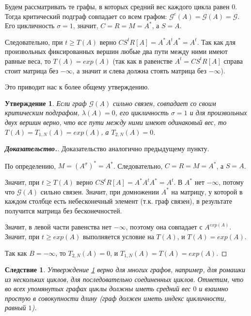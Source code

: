 \documentclass[12pt]{article}
\newtheorem{proposition}[theorem]{Утверждение}
\newtheorem{corollary}[theorem]{Следствие}
\begin{document}
Будем рассматривать те графы, в которых средний вес каждого цикла равен $0$. Тогда критический подграф совпадает со всем графом: $\mathcal{G}^c(A) = \mathcal{G}(A) = \mathcal{G}$. Его цикличность $\sigma = 1$, значит, $C = R = M = A^*$, а $S = A$.

Следовательно, при $t \ge T(A)$ верно $CS^tR[A] = A^*A^tA^* = A^t$. Так как для произвольных фиксированных вершин любые два пути между ними имеют равные веса, то $T(A) = exp(A)$ (так как в равенстве $A^t = CS^tR[A]$ справа стоит матрица без $-\infty$, а значит и слева должна стоять матрица без $-\infty$).

Это приводит нас к более общему утверждению.

\begin{proposition} \label{onePathProposition}
Если граф $\mathcal{G}(A)$ сильно связен, совпадает со своим критическим подграфом, $\lambda(A) = 0$, его цикличность $\sigma = 1$ и для произвольных двух вершин верно, что все пути между ними имеют одинаковый вес, то $T(A) = T_{1, N}(A) = exp(A)$, а $T_{2,N}(A) = 0$.
\end{proposition}
\begin{proof}[\textbf{Доказательство.}]
Доказательство аналогично предыдущему пункту.

По определению, $M = (A^\sigma)^* = A^*$. Следовательно, $C = R = M = A^*$, а $S = A$.

Значит, при $t \ge T(A)$ верно $CS^tR[A] = A^*A^tA^* = A^t$. В $A^*$ нет $-\infty$, потому что $\mathcal{G}(A)$ сильно связен. Значит, при домножении $A^*$ на матрицу, у которой в каждом столбце есть небесконечный элемент (т.к. граф связен), в результате получится матрица без бесконечностей.

Значит, в левой части равенства нет $-\infty$, поэтому она совпадает с $A^{exp(A)}$. Значит, при $t \ge exp(A)$ выполняется условие на $T(A)$, и $T(A) = exp(A)$.

Так как $B = -\infty$, то $T_{2, N}(A) = 0$, и $T_{1,N}(A) = T(A) = exp(A)$.
\end{proof}
\begin{corollary}
\label{corollaryTandExp}
Утверждение \ref{onePathProposition} верно для многих графов, например, для ромашки из нескольких циклов, для последовательно соединенных циклов. Отметим, что во всех упомянутых графах циклы должны иметь средний вес $0$ и взаимно простую в совокупности длину (граф должен иметь индекс цикличности, равный $1$).
\end{corollary}
\end{document}
